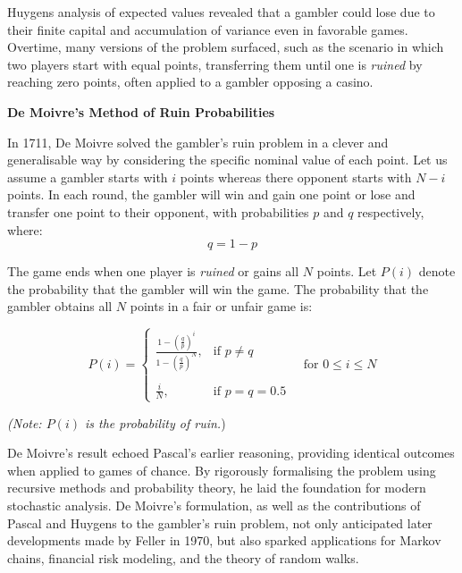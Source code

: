 Huygens analysis of expected values revealed that a gambler could lose due to their finite capital and accumulation of variance even in favorable games. Overtime, many versions of the problem surfaced, such as the scenario in which two players start with equal points, transferring them until one is \textit{ruined} by reaching zero points, often applied to a gambler opposing a casino.

\vspace{1em}
\noindent \textbf{De Moivre's Method of Ruin Probabilities }
\vspace{1em}

In 1711, De Moivre solved the gambler's ruin problem in a clever and generalisable way by considering the specific nominal value of each point. Let us assume a gambler starts with $i$  points whereas there opponent starts with $N - i$  points. In each round, the gambler will win and gain one point or lose and transfer one point to their opponent, with probabilities $p$ and $q$ respectively, where:
\begin{equation}  q=1-p \end{equation}

The game ends when one player is \textit{ruined} or gains all $N$ points. Let $P(i)$ denote the probability that the gambler will win the game. The probability that the gambler obtains all $N$  points in a fair or unfair game is:

\[
P(i) = 
\begin{cases}
\displaystyle\frac{1 - \left( \frac{q}{p} \right)^i}{1 - \left( \frac{q}{p} \right)^N}, & \text{if } p \ne q \\
\\
\displaystyle\frac{i}{N}, & \text{if } p = q = 0.5
\end{cases}
\quad \text{for } 0 \leq i \leq N
\]
\vspace{0.5em}

\textit{(Note: $P(i)$ is the probability of ruin.})

\vspace{0.5em}

De Moivre's result echoed Pascal's earlier reasoning, providing identical outcomes when applied to games of chance. By rigorously formalising the problem using recursive methods and probability theory, he laid the foundation for modern stochastic analysis. De Moivre's formulation, as well as the contributions of Pascal and Huygens to the gambler's ruin problem, not only anticipated later developments made by Feller in 1970, but also sparked applications for Markov chains, financial risk modeling, and the theory of random walks.

